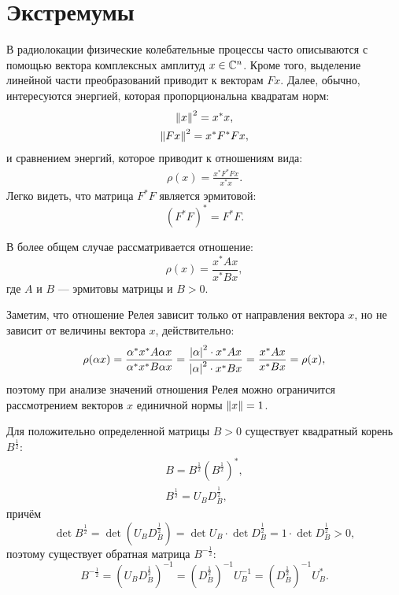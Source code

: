 \section{Экстремумы}

В радиолокации физические колебательные процессы часто описываются с помощью вектора комплексных амплитуд $x \in \mathbb{C}^{n}$. Кроме того, выделение линейной части
преобразований приводит к векторам $Fx$. Далее, обычно, интересуются энергией, которая пропорциональна квадратам норм:
\begin{gather*}
    \left \| x \right \|^2 = x^* x , \\
    \left \| F x \right \|^2 = x^* F^* F x ,
\end{gather*}
и сравнением энергий, которое приводит к отношениям вида:
\begin{gather*}
    \rho(x) = \frac{x^* F^* F x}{x^* x}.
\end{gather*}
Легко видеть, что матрица $F^* F$ является эрмитовой:
\[
    ( F^* F )^* = F^* F .
\]

В более общем случае рассматривается отношение:
\[
    \rho(x) = \frac{x^* A x}{x^* B x},
\]
где $A$ и $B$ --- эрмитовы матрицы и $B > 0$.

Заметим, что отношение Релея зависит только от направления вектора $x$, но не зависит от величины вектора $x$, действительно:
\begin{equation}
    \label{rayleight:extrema:homogenity}
    \rho(\alpha x)
    = \frac{\alpha^* x^* A \alpha x}{ \alpha^* x^* B \alpha x}
    = \frac{\left | \alpha \right |^2 \cdot x^* A x}{ \left | \alpha \right |^2 \cdot x^* B x}
    = \frac{x^* A x}{x^* B x}
    = \rho(x) ,
\end{equation}
поэтому при анализе значений отношения Релея можно ограничится рассмотрением векторов $x$ единичной нормы $\left \| x \right \| = 1$.

Для положительно определенной матрицы $B > 0$ существует квадратный корень $B^\frac{1}{2}$:
\begin{gather*}
    B = B^\frac{1}{2} ( B^\frac{1}{2} )^* , \\
    B^\frac{1}{2} = U_B D_B^\frac{1}{2} ,
\end{gather*}
причём
\[
    \det B^\frac{1}{2}
    = \det ( U_B D_B^\frac{1}{2} )
    = \det U_B \cdot \det D_B^\frac{1}{2}
    = 1 \cdot \det D_B^\frac{1}{2}
    > 0 ,
\]
поэтому существует обратная матрица $B^{-\frac{1}{2}}$:
\[
    B^{-\frac{1}{2}}
    = \left ( U_B D_B^\frac{1}{2} \right )^{-1}
    = \left ( D_B^\frac{1}{2} \right )^{-1} U_B^{-1}
    = \left ( D_B^\frac{1}{2} \right )^{-1} U_B^* .
\]

